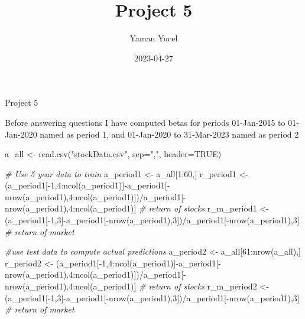 \documentclass[
]{article}
\title{Project 5}
\author{Yaman Yucel}
\date{2023-04-27}
\newenvironment{Shaded}{\begin{snugshade}}{\end{snugshade}}
\newcommand{\AttributeTok}[1]{\textcolor[rgb]{0.77,0.63,0.00}{#1}}
\newcommand{\CommentTok}[1]{\textcolor[rgb]{0.56,0.35,0.01}{\textit{#1}}}
\newcommand{\ConstantTok}[1]{\textcolor[rgb]{0.00,0.00,0.00}{#1}}
\newcommand{\DecValTok}[1]{\textcolor[rgb]{0.00,0.00,0.81}{#1}}
\newcommand{\FunctionTok}[1]{\textcolor[rgb]{0.00,0.00,0.00}{#1}}
\newcommand{\NormalTok}[1]{#1}
\newcommand{\OtherTok}[1]{\textcolor[rgb]{0.56,0.35,0.01}{#1}}
\newcommand{\SpecialCharTok}[1]{\textcolor[rgb]{0.00,0.00,0.00}{#1}}
\newcommand{\StringTok}[1]{\textcolor[rgb]{0.31,0.60,0.02}{#1}}
\begin{document}
\maketitle

Project 5

Before answering questions I have computed betas for periods 01-Jan-2015
to 01-Jan-2020 named as period 1, and 01-Jan-2020 to 31-Mar-2023 named
as period 2

\begin{Shaded}
\begin{Highlighting}[]
\NormalTok{a\_all }\OtherTok{\textless{}{-}} \FunctionTok{read.csv}\NormalTok{(}\StringTok{"stockData.csv"}\NormalTok{, }\AttributeTok{sep=}\StringTok{","}\NormalTok{, }\AttributeTok{header=}\ConstantTok{TRUE}\NormalTok{) }

\CommentTok{\# Use 5 year data to train }
\NormalTok{a\_period1 }\OtherTok{\textless{}{-}}\NormalTok{ a\_all[}\DecValTok{1}\SpecialCharTok{:}\DecValTok{60}\NormalTok{,] }
\NormalTok{r\_period1 }\OtherTok{\textless{}{-}}\NormalTok{ (a\_period1[}\SpecialCharTok{{-}}\DecValTok{1}\NormalTok{,}\DecValTok{4}\SpecialCharTok{:}\FunctionTok{ncol}\NormalTok{(a\_period1)]}\SpecialCharTok{{-}}\NormalTok{a\_period1[}\SpecialCharTok{{-}}\FunctionTok{nrow}\NormalTok{(a\_period1),}\DecValTok{4}\SpecialCharTok{:}\FunctionTok{ncol}\NormalTok{(a\_period1)])}\SpecialCharTok{/}\NormalTok{a\_period1[}\SpecialCharTok{{-}}\FunctionTok{nrow}\NormalTok{(a\_period1),}\DecValTok{4}\SpecialCharTok{:}\FunctionTok{ncol}\NormalTok{(a\_period1)] }\CommentTok{\# return of stocks}
\NormalTok{r\_m\_period1 }\OtherTok{\textless{}{-}}\NormalTok{ (a\_period1[}\SpecialCharTok{{-}}\DecValTok{1}\NormalTok{,}\DecValTok{3}\NormalTok{]}\SpecialCharTok{{-}}\NormalTok{a\_period1[}\SpecialCharTok{{-}}\FunctionTok{nrow}\NormalTok{(a\_period1),}\DecValTok{3}\NormalTok{])}\SpecialCharTok{/}\NormalTok{a\_period1[}\SpecialCharTok{{-}}\FunctionTok{nrow}\NormalTok{(a\_period1),}\DecValTok{3}\NormalTok{] }\CommentTok{\# return of market}

\CommentTok{\#use test data to compute actual predictions}
\NormalTok{a\_period2 }\OtherTok{\textless{}{-}}\NormalTok{ a\_all[}\DecValTok{61}\SpecialCharTok{:}\FunctionTok{nrow}\NormalTok{(a\_all),]}
\NormalTok{r\_period2 }\OtherTok{\textless{}{-}}\NormalTok{ (a\_period1[}\SpecialCharTok{{-}}\DecValTok{1}\NormalTok{,}\DecValTok{4}\SpecialCharTok{:}\FunctionTok{ncol}\NormalTok{(a\_period1)]}\SpecialCharTok{{-}}\NormalTok{a\_period1[}\SpecialCharTok{{-}}\FunctionTok{nrow}\NormalTok{(a\_period1),}\DecValTok{4}\SpecialCharTok{:}\FunctionTok{ncol}\NormalTok{(a\_period1)])}\SpecialCharTok{/}\NormalTok{a\_period1[}\SpecialCharTok{{-}}\FunctionTok{nrow}\NormalTok{(a\_period1),}\DecValTok{4}\SpecialCharTok{:}\FunctionTok{ncol}\NormalTok{(a\_period1)] }\CommentTok{\# return of stocks}
\NormalTok{r\_m\_period2 }\OtherTok{\textless{}{-}}\NormalTok{ (a\_period1[}\SpecialCharTok{{-}}\DecValTok{1}\NormalTok{,}\DecValTok{3}\NormalTok{]}\SpecialCharTok{{-}}\NormalTok{a\_period1[}\SpecialCharTok{{-}}\FunctionTok{nrow}\NormalTok{(a\_period1),}\DecValTok{3}\NormalTok{])}\SpecialCharTok{/}\NormalTok{a\_period1[}\SpecialCharTok{{-}}\FunctionTok{nrow}\NormalTok{(a\_period1),}\DecValTok{3}\NormalTok{] }\CommentTok{\# return of market}


\end{Highlighting}
\end{Shaded}
\end{document}
